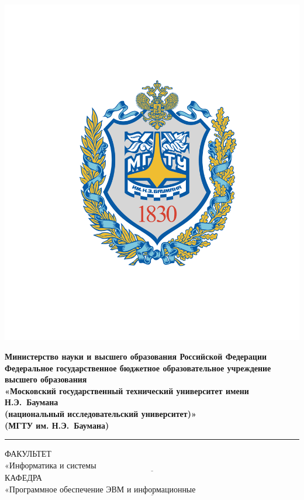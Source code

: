 \begin{titlepage}
\thispagestyle{empty}
\fontsize{12pt}{12pt}\selectfont
\noindent \begin{minipage}{0.15\textwidth}
    \includegraphics[width=\linewidth]{img/emblem.png}
\end{minipage}
\noindent\begin{minipage}{0.9\textwidth}\centering
    \textbf{Министерство науки и высшего образования Российской Федерации}\\
    \textbf{Федеральное государственное бюджетное образовательное учреждение высшего образования}\\
    \textbf{«Московский государственный технический университет имени Н.Э.~Баумана}\\
    \textbf{(национальный исследовательский университет)»}\\
    \textbf{(МГТУ им. Н.Э.~Баумана)}
\end{minipage}

\noindent\rule{18cm}{3pt}
\newline\newline
\noindent ФАКУЛЬТЕТ $\underline{\text{«Информатика и системы управления»~~~~~~~~~~~~~~~~~~~~~~~~~~~~~~~~~~~~~~~~~~~~~~~~~~~~~~~~~~~~~~~~~~~~~~~~~~~~~~~~~}}$ \newline\newline
\noindent КАФЕДРА $\underline{\text{«Программное обеспечение ЭВМ и информационные технологии»~~~~~~~~~~~~~~~~~~~~~~~~~~~~~~~~~~~~~~~}}$\newline\newline\newline\newline\newline\newline\newline



\end{titlepage}
